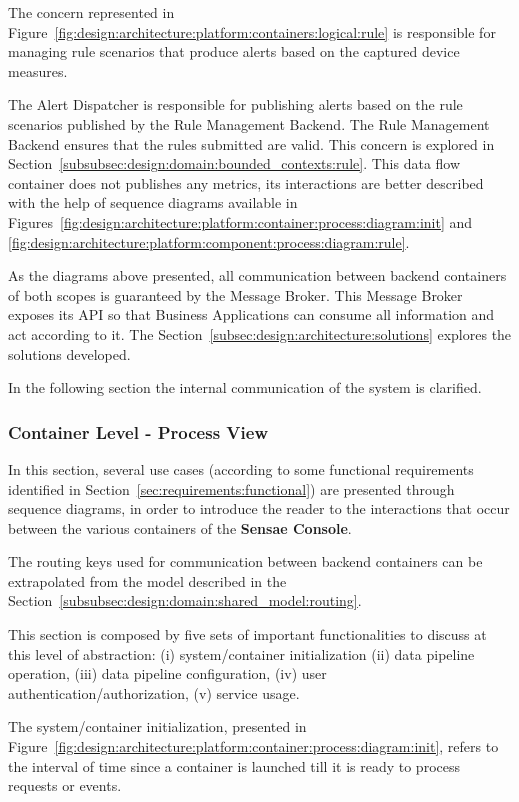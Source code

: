 The concern represented in Figure~\ref{fig:design:architecture:platform:containers:logical:rule} is responsible for managing rule scenarios that produce alerts based on the captured device measures.

The Alert Dispatcher is responsible for publishing alerts based on the rule scenarios published by the Rule Management Backend. The Rule Management Backend ensures that the rules submitted are valid. This concern is explored in Section~\ref{subsubsec:design:domain:bounded_contexts:rule}. This data flow container does not publishes any metrics, its interactions are better described with the help of sequence diagrams available in Figures~\ref{fig:design:architecture:platform:container:process:diagram:init} and \ref{fig:design:architecture:platform:component:process:diagram:rule}.

As the diagrams above presented, all communication between backend containers of both scopes is guaranteed by the Message Broker. This Message Broker exposes its \gls{API} so that Business Applications can consume all information and act according to it. The Section~\ref{subsec:design:architecture:solutions} explores the solutions developed.

In the following section the internal communication of the system is clarified.

\subsubsection{Container Level - Process View}
\label{par:design:architecture:platform:container:process}

In this section, several use cases (according to some functional requirements identified in Section~\ref{sec:requirements:functional}) are presented through sequence diagrams, in order to introduce the reader to the interactions that occur between the various containers of the \textbf{Sensae Console}.

The routing keys used for communication between backend containers can be extrapolated from the model described in the Section~\ref{subsubsec:design:domain:shared_model:routing}.

This section is composed by five sets of important functionalities to discuss at this level of abstraction: (i) system/container initialization (ii) data pipeline operation, (iii) data pipeline configuration, (iv) user authentication/authorization, (v) service usage.

The system/container initialization, presented in Figure~\ref{fig:design:architecture:platform:container:process:diagram:init}, refers to the interval of time since a container is launched till it is ready to process requests or events.

